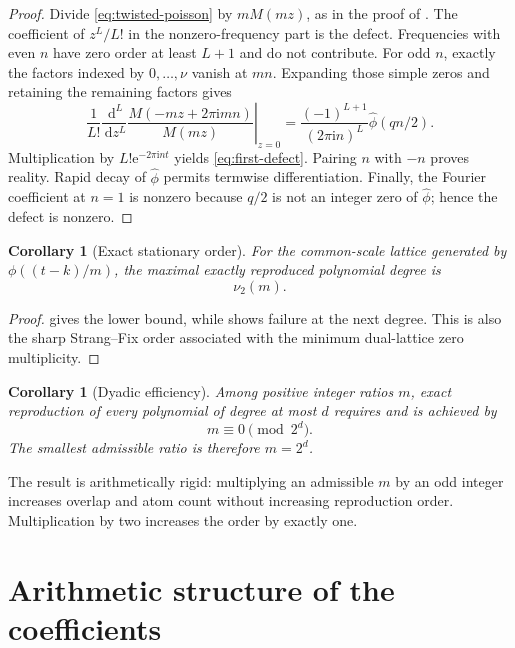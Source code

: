 \documentclass[11pt,oneside]{article}
\newtheorem{corollary}[theorem]{Corollary}
\theoremstyle{definition}
\theoremstyle{remark}
\newcommand{\vtwo}{\nu_2}
\newcommand{\dd}{\,\mathrm d}
\newcommand{\e}{\mathrm e}
\newcommand{\ii}{\mathrm i}
\begin{document}
\begin{proof}
Divide \eqref{eq:twisted-poisson} by \(mM(mz)\), as in the proof of
.  The coefficient of \(z^L/L!\) in the
nonzero-frequency part is the defect.  Frequencies with even \(n\) have zero
order at least \(L+1\) and do not contribute.  For odd \(n\), exactly the
factors indexed by \(0,\ldots,\nu\) vanish at \(mn\).  Expanding those simple
zeros and retaining the remaining factors gives
\[
 \frac1{L!}\left.\frac{\dd^L}{\dd z^L}
 \frac{M(-mz+2\pi\ii mn)}{M(mz)}\right|_{z=0}
 =\frac{(-1)^{L+1}}{(2\pi\ii n)^L}\widehat\phi(qn/2).
\]
Multiplication by \(L!\e^{-2\pi\ii nt}\) yields
\eqref{eq:first-defect}.  Pairing \(n\) with \(-n\) proves reality.  Rapid
decay of \(\widehat\phi\) permits termwise differentiation.  Finally, the
Fourier coefficient at \(n=1\) is nonzero because \(q/2\) is not an integer
zero of \(\widehat\phi\); hence the defect is nonzero.
\end{proof}

\begin{corollary}[Exact stationary order]
\label{cor:exact-order}
For the common-scale lattice generated by
\(\phi((t-k)/m)\), the maximal exactly reproduced polynomial degree is
\[
 \boxed{\vtwo(m)}.
\]
\end{corollary}

\begin{proof}
 gives the lower bound, while
 shows failure at the next degree.  This is also the
sharp Strang--Fix order associated with the minimum dual-lattice zero
multiplicity.
\end{proof}

\begin{corollary}[Dyadic efficiency]
\label{cor:minimum-m}
Among positive integer ratios \(m\), exact reproduction of every polynomial of
degree at most \(d\) requires and is achieved by
\[
 m\equiv0\pmod{2^d}.
\]
The smallest admissible ratio is therefore \(m=2^d\).
\end{corollary}

The result is arithmetically rigid: multiplying an admissible \(m\) by an odd
integer increases overlap and atom count without increasing reproduction
order.  Multiplication by two increases the order by exactly one.

\section{Arithmetic structure of the coefficients}
\label{sec:arithmetic}
\end{document}
